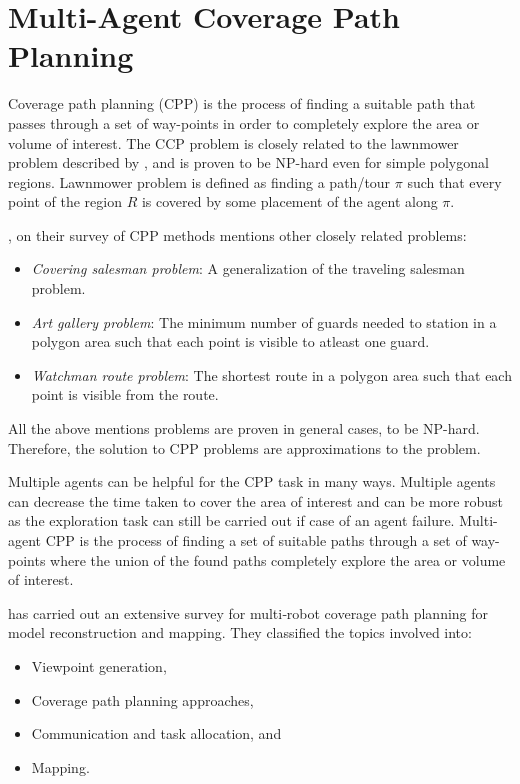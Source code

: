 \section{Multi-Agent Coverage Path Planning}

Coverage path planning (CPP) is the process of finding a suitable path that passes through a set of way-points in order to completely explore the area or volume of interest. The CCP problem is closely related to the lawnmower problem described by , and is proven to be NP-hard even for simple polygonal regions. Lawnmower problem is defined as finding a path/tour $\pi$ such that every point of the region $R$ is covered by some placement of the agent along $\pi$.

, on their survey of CPP methods mentions other closely related problems:

\begin{itemize}
	\item \textit{Covering salesman problem}: A generalization of the traveling salesman problem.
	\item \textit{Art gallery problem}: The minimum number of guards needed to station in a polygon area such that each point is visible to atleast one guard.
	\item \textit{Watchman route problem}: The shortest route in a polygon area such that each point is visible from the route.
\end{itemize}

All the above mentions problems are proven in general cases, to be NP-hard. Therefore, the solution to CPP problems are approximations to the problem.

Multiple agents can be helpful for the CPP task in many ways. Multiple agents can decrease the time taken to cover the area of interest and can be more robust as the exploration task can still be carried out if case of an agent failure. Multi-agent CPP is the process of finding a set of suitable paths through a set of way-points where the union of the found paths completely explore the area or volume of interest. 

 has carried out an extensive survey for multi‑robot coverage path planning for model reconstruction and mapping. They classified the topics involved into:
\begin{itemize}
	\item Viewpoint generation,
	\item Coverage path planning approaches,
	\item Communication and task allocation, and
	\item Mapping.
\end{itemize}

